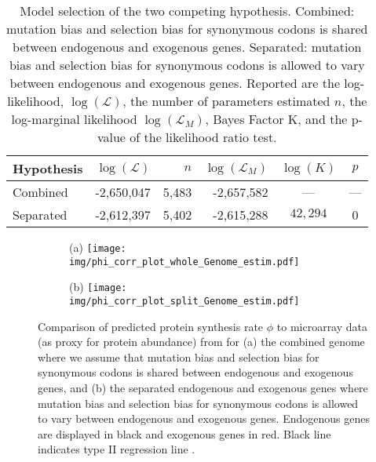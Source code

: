 \documentclass[doublespacing,linenumbers]{bmcart}
\newcommand{\Lik}{\ensuremath{\mathcal{L}}\xspace}
\begin{document}
\begin{table}
  \centering
  \caption{Model selection of the two competing hypothesis. 
  Combined: mutation bias and selection bias for synonymous codons is shared between endogenous and exogenous genes.
  Separated: mutation bias and selection bias for synonymous codons is allowed to vary between endogenous and exogenous genes.
  Reported are the log-likelihood, $\log(\Lik)$, the number of parameters estimated $n$, the log-marginal likelihood $\log(\Lik_M)$, Bayes Factor K, and the p-value of the likelihood ratio test.}
  \begin{tabular}{lrrrcc}
    \hline
    Hypothesis             & $\log(\Lik)$ &$n$ & $\log(\Lik_M)$ & $\log(K)$ & $p$\\ \hline 
    Combined               & -2,650,047 & 5,483 & -2,657,582 & --- & ---\\
    Separated		   & -2,612,397 & 5,402 & -2,615,288 & $42,294$ & 0\\ \hline
  \end{tabular}
  \label{tab:AIC_klu}
\end{table}

\begin{figure}
    \centering
    \begin{subfigure}
        \centering
        (a) \texttt{[image: img/phi\_corr\_plot\_whole\_Genome\_estim.pdf]}
    \end{subfigure}
    \begin{subfigure}
        \centering
        (b) \texttt{[image: img/phi\_corr\_plot\_split\_Genome\_estim.pdf]}
    \end{subfigure}
    \caption{Comparison of predicted protein synthesis rate $\phi$ to microarray data (as proxy for protein abundance) from \cite{tsankov2010} for (a) the combined genome where we assume that mutation bias and selection bias for synonymous codons is shared between endogenous and exogenous genes, and (b) the     separated endogenous and exogenous genes where  mutation bias and selection bias for synonymous codons is allowed to vary between endogenous and     exogenous genes. 
    Endogenous genes are displayed in black and exogenous genes in red. 
    Black line indicates type II regression line \citep{SokalAndRohlf1981}.}
    \label{fig:phi_corr_two_cond}
\end{figure}
\end{document}
